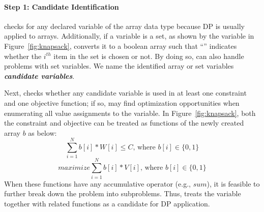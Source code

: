 \paragraph*{Step 1: Candidate Identification}
\tool checks for any declared variable of the array data type because DP is usually applied to arrays. Additionally, if a variable is a set, as shown by the  variable in Figure~\ref{fig:knapsack}, \tool converts it to a boolean array  such that ``'' indicates whether the $i^{th}$ item in the set is chosen or not. 
By doing so, \tool can also handle problems with set variables. We name the identified array or set variables \textbf{\emph{candidate variables}}. 
 
Next, \tool checks 
whether any candidate variable is used in at least one constraint and one objective function; if so, \tool may find optimization opportunities when enumerating all value assignments to the variable. 
In Figure~\ref{fig:knapsack}, both the constraint and objective can be treated as functions of the newly created array $b$ as below: 
\begin{equation}
\label{eq1}
   \sum_{i=1}^{N}b[i]*W[i] \le C \text{, where }b[i]\in\{0, 1\}  \tag{3.1}
\end{equation}
\begin{equation}
\label{eq2}
    maximize \sum_{i=1}^{N}b[i]*V[i] \text{, where }b[i]\in\{0, 1\}  \tag{3.2}
\end{equation}
When these functions have any accumulative operator (e.g., $sum$), it is feasible to further break down the problem into subproblems.
Thus, \tool treats the variable  together with related functions as a candidate for DP application.

